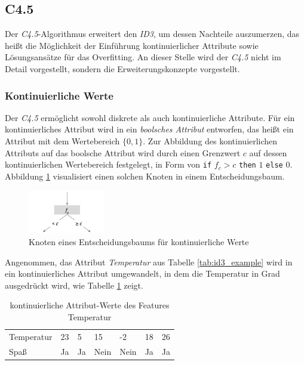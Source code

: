 \subsection{C4.5}

Der \emph{C4.5}-Algorithmus erweitert den \emph{ID3}, um dessen Nachteile auszumerzen, das heißt die Möglichkeit der Einführung kontinuierlicher Attribute sowie Lösungsansätze für das Overfitting. An dieser Stelle wird der \emph{C4.5} nicht im Detail vorgestellt, sondern die Erweiterungskonzepte vorgestellt. \cite[S. 66]{machine_mitchell}

\subsubsection*{Kontinuierliche Werte}
Der \emph{C4.5} ermöglicht sowohl diskrete als auch kontinuierliche Attribute. Für ein kontinuierliches Attribut wird in ein \emph{boolsches Attribut} entworfen, das heißt ein Attribut mit dem Wertebereich $\{0,1\}$. Zur Abbildung des kontinuierlichen Attributs auf das boolsche Attribut wird durch einen Grenzwert $c$ auf dessen kontinuierlichen Wertebereich festgelegt, in Form von \texttt{if} $f_c > c$ \texttt{then} $1$ \texttt{else} $0$. Abbildung \ref{img:c45_contvalue} visualisiert einen solchen Knoten in einem Entscheidungsbaum. \cite[S. 72]{machine_mitchell}

\begin{figure}[h]
	\centering
	\includegraphics[width=0.3\textwidth]{bilder/c45_contvalue.png}
	\caption{Knoten eines Entscheidungsbaums für kontinuierliche Werte}
	\label{img:c45_contvalue}
\end{figure}

Angenommen, das Attribut \emph{Temperatur} aus Tabelle \ref{tab:id3_example} wird in ein kontinuierliches Attribut umgewandelt, in dem die Temperatur in Grad ausgedrückt wird, wie Tabelle \ref{tab:c45-example} zeigt. 

\begin{table}[h]
	\centering
	\caption{kontinuierliche Attribut-Werte des Features \glqq Temperatur\grqq }
	\label{tab:c45-example}
	\begin{tabular}{lllllll}
		\toprule
		Temperatur & 23   & 5   & 15 & -2 & 18 & 26  \\
		Spaß       & Ja & Ja & Nein & Nein & Ja &Ja \\ \bottomrule
	\end{tabular}
\end{table}

